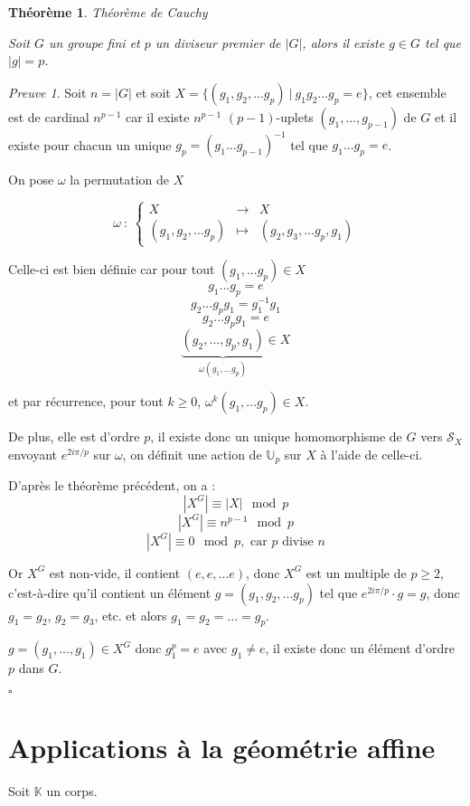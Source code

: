 \documentclass[]{article}
\newtheorem{mythm}{Théorème}
\theoremstyle{remark}
\newtheorem{myproof}{Preuve}
\theoremstyle{definition}
\newcommand{\cqfd}{
	\hfill$\square$
}
\newcommand{\func}[5]{
#1 ~ : ~ \left\{ \begin{array}{lcl}
	#2 & \longrightarrow & #3 \\
	#4 & \longmapsto & #5
\end{array}
\right.
}
\begin{document}
\begin{mythm}Théorème de Cauchy

	Soit $G$ un groupe fini et $p$ un diviseur premier de $|G|$, alors il existe $g \in G$ tel que $|g|=p$.
\end{mythm}

\begin{myproof}
	Soit $n = |G|$ et soit $X = \{(g_1, g_2, ...g_p) ~ | ~ g_1 g_2 ... g_p = e\}$, cet ensemble est de cardinal $n^{p-1}$ car il existe $n^{p-1}$ $(p-1)$-uplets $(g_1, ..., g_{p-1})$ de $G$ et il existe pour chacun un unique $g_p = (g_1...g_{p-1})^{-1}$ tel que $g_1...g_p = e$.
	
	On pose $\omega$ la permutation de $X$
	
	$$\func{\omega}{X}{X}{(g_1, g_2, ... g_p)}{(g_2, g_3, ... g_p, g_1)}$$
	
	Celle-ci est bien définie car pour tout $(g_1, ... g_p) \in X$
	$$g_1...g_p = e$$
	$$g_2...g_p g_1 = g_1^{-1} g_1$$
	$$g_2...g_p g_1 = e$$
	$$\underbrace{(g_2, ..., g_p, g_1)}_{\omega(g_1, ...g_p)} \in X$$
	
	et par récurrence, pour tout $k \geqslant 0$, $\omega^k (g_1, ...g_p) \in X$.
	
	De plus, elle est d'ordre $p$, il  existe donc un unique homomorphisme de $G$ vers $\mathcal{S}_X$ envoyant $e^{2 i \pi / p}$ sur $\omega$, on définit une action de $\mathbb{U}_p$ sur $X$ à l'aide de celle-ci.
	
	D'après le théorème précédent, on a :
	$$\left|X^G\right| \equiv |X| \mod p$$
	$$\left|X^G\right| \equiv n^{p-1} \mod p$$
	$$\left|X^G\right| \equiv 0 \mod p, \text{ car $p$ divise $n$}$$
	
	Or $X^G$ est non-vide, il contient $(e, e, ...e)$, donc $X^G$ est un multiple de $p \geqslant 2$, c'est-à-dire qu'il contient un élément $g=(g_1, g_2, ... g_p)$ tel que $e^{2 i \pi / p} \cdot g = g$, donc $g_1 = g_2$, $g_2 = g_3$, etc. et alors $g_1 = g_2 = ... = g_p$.
	
	$g=(g_1, ..., g_1) \in X^G$ donc $g_1^p = e$ avec $g_1 \neq e$, il existe donc un élément d'ordre $p$ dans $G$.
	
	\cqfd
\end{myproof}

\section{Applications à la géométrie affine}

Soit $\mathbb{K}$ un corps.
\end{document}
